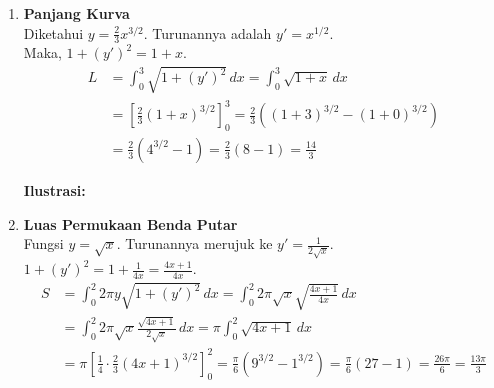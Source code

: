 \documentclass[a4paper,12pt]{article}
\begin{document}
\begin{enumerate}
  \item \textbf{Panjang Kurva} \\
        Diketahui $y = \frac{2}{3}x^{3/2}$. Turunannya adalah $y' = x^{1/2}$. \\
        Maka, $1 + (y')^2 = 1 + x$.
        \begin{align*}
          L & = \int_0^3 \sqrt{1 + (y')^2} \,dx = \int_0^3 \sqrt{1 + x} \,dx                                       \\
            & = \left[ \frac{2}{3}(1 + x)^{3/2} \right]_0^3 = \frac{2}{3} \left( (1+3)^{3/2} - (1+0)^{3/2} \right) \\
            & = \frac{2}{3} (4^{3/2} - 1) = \frac{2}{3} (8 - 1) = \frac{14}{3}
        \end{align*}

        \textbf{Ilustrasi:}
        \begin{center}
        \end{center}

  \item \textbf{Luas Permukaan Benda Putar} \\
        Fungsi $y = \sqrt{x}$. Turunannya merujuk ke $y' = \frac{1}{2\sqrt{x}}$. \\
        $1 + (y')^2 = 1 + \frac{1}{4x} = \frac{4x + 1}{4x}$.
        \begin{align*}
          S & = \int_0^2 2\pi y \sqrt{1 + (y')^2} \,dx = \int_0^2 2\pi \sqrt{x} \sqrt{\frac{4x+1}{4x}} \,dx                                                                                     \\
            & = \int_0^2 2\pi \sqrt{x} \frac{\sqrt{4x+1}}{2\sqrt{x}} \,dx = \pi \int_0^2 \sqrt{4x+1} \,dx                                                                                       \\
            & = \pi \left[ \frac{1}{4} \cdot \frac{2}{3} (4x+1)^{3/2} \right]_0^2 = \frac{\pi}{6} \left( 9^{3/2} - 1^{3/2} \right) = \frac{\pi}{6} (27 - 1) = \frac{26\pi}{6} = \frac{13\pi}{3}
        \end{align*}


\end{enumerate}
\end{document}
